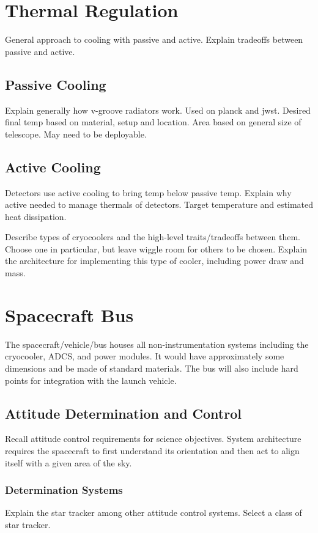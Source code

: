 \documentclass{ws-jai}
\begin{document}
\section{Thermal Regulation}
\label{S:tempregulation}
General approach to cooling with passive and active. Explain tradeoffs between passive and active.

\subsection{Passive Cooling}
\label{sS:vgrooves}
Explain generally how v-groove radiators work. Used on planck and jwst. Desired final temp based on material, setup and location. Area based on general size of telescope. May need to be deployable.

\subsection{Active Cooling}
\label{sS:cryocooler}
Detectors use active cooling to bring temp below passive temp. Explain why active needed to manage thermals of detectors. Target temperature and estimated heat dissipation.

Describe types of cryocoolers and the high-level traits/tradeoffs between them. Choose one in particular, but leave wiggle room for others to be chosen. Explain the architecture for implementing this type of cooler, including power draw and mass.

\section{Spacecraft Bus}
\label{S:bus}
The spacecraft/vehicle/bus houses all non-instrumentation systems including the cryocooler, ADCS, and power modules. It would have approximately some dimensions and be made of standard materials. The bus will also include hard points for integration with the launch vehicle.

\subsection{Attitude Determination and Control}
\label{sS:adcs}
Recall attitude control requirements for science objectives. System architecture requires the spacecraft to first understand its orientation and then act to align itself with a given area of the sky.

\subsubsection{Determination Systems}
\label{ssS:determination}
Explain the star tracker among other attitude control systems. Select a class of star tracker.
\end{document}
